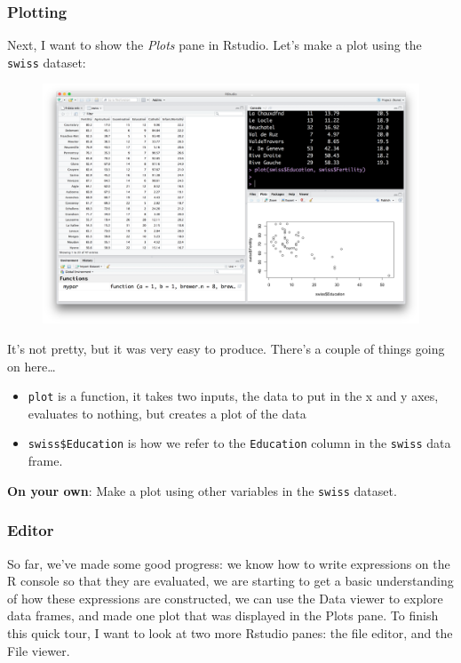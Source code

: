 \documentclass[]{article}
\theoremstyle{definition}
\theoremstyle{definition}
\theoremstyle{remark}
\begin{document}
\subsubsection{Plotting}\label{plotting}

Next, I want to show the \emph{Plots} pane in Rstudio. Let's make a plot
using the \texttt{swiss} dataset:

\begin{figure}[htbp]
\centering
\includegraphics{img/rstudio_plot_swiss.png}
\caption{}
\end{figure}

It's not pretty, but it was very easy to produce. There's a couple of
things going on here\ldots{}

\begin{itemize}
\item
  \texttt{plot} is a function, it takes two inputs, the data to put in
  the x and y axes, evaluates to nothing, but creates a plot of the data
\item
  \texttt{swiss\$Education} is how we refer to the \texttt{Education}
  column in the \texttt{swiss} data frame.
\end{itemize}

\textbf{On your own}: Make a plot using other variables in the
\texttt{swiss} dataset.

\subsubsection{Editor}\label{editor}

So far, we've made some good progress: we know how to write expressions
on the R console so that they are evaluated, we are starting to get a
basic understanding of how these expressions are constructed, we can use
the Data viewer to explore data frames, and made one plot that was
displayed in the Plots pane. To finish this quick tour, I want to look
at two more Rstudio panes: the file editor, and the File viewer.
\end{document}
